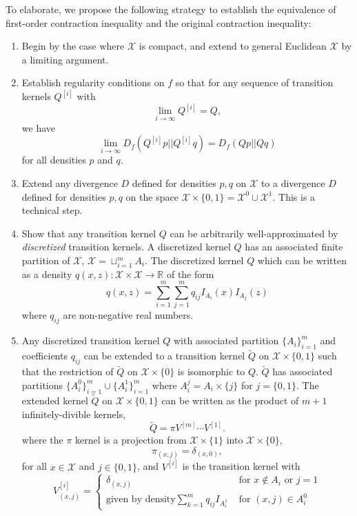 \documentclass[12pt]{article}
\begin{document}
To elaborate, we propose the following strategy to establish the
equivalence of first-order contraction inequality and the original
contraction inequality:
\begin{enumerate}
\item Begin by the case where $\mathcal{X}$ is compact, and extend to general Euclidean $\mathcal{X}$ by a limiting argument.
\item Establish regularity conditions on $f$ so that for any sequence of transition kernels $Q^{[i]}$ with
\[
\lim_{i \to \infty} Q^{[i]} = Q,
\]
we have
\[
\lim_{i \to \infty} D_f(Q^{[i]}p||Q^{[i]}q) = D_f(Qp||Qq)
\]
for all densities $p$ and $q$.
\item Extend any divergence $D$ defined for densities $p, q$ on $\mathcal{X}$ to a divergence $D$ defined for densities $p, q$ 
on the space $\mathcal{X} \times \{0,1\} = \mathcal{X}^0 \cup \mathcal{X}^1$.  This is a technical step.
\item Show that any transition kernel $Q$ can be arbitrarily well-approximated by \emph{discretized} transition kernels.
A discretized kernel $Q$ has an associated finite partition of $\mathcal{X}$, $\mathcal{X} = \sqcup_{i=1}^m A_i$. 
The discretized kernel $Q$ which can be written as a density $q(x,z): \mathcal{X} \times \mathcal{X} \to \mathbb{R}$ of the form
\[
q(x,z) = \sum_{i=1}^m \sum_{j=1}^m q_{ij} I_{A_i}(x) I_{A_j}(z)
\]
where $q_{ij}$ are non-negative real numbers.
\item Any discretized transition kernel $Q$ with associated partition $\{A_i\}_{i=1}^m$ and coefficients $q_{ij}$ can be extended to a transition kernel $\tilde{Q}$ on $\mathcal{X} \times \{0,1\}$ such that the restriction of $\tilde{Q}$ on $\mathcal{X} \times \{0\}$ is isomorphic to $Q$.
$\tilde{Q}$ has associated partitions $\{A_i^0\}_{i=1}^m \cup \{A_i^1\}_{i=1}^m$ where $A_i^j = A_i \times \{j\}$ for $j = \{0,1\}$.  The extended kernel $\tilde{Q}$ on $\mathcal{X} \times \{0,1\}$ can be written as the product of $m+1$ infinitely-divible kernels,
\[
\tilde{Q} = \pi V^{[m]} \cdots V^{[1]}.
\]
where the $\pi$ kernel is a projection from $\mathcal{X}\times\{1\}$ into $\mathcal{X}\times\{0\}$,
\[
\pi_{(x,j)} = \delta_{(x,0)},
\]
for all $x \in \mathcal{X}$ and $j \in \{0,1\}$,
and $V^{[i]}$ is the transition kernel with
\[
V^{[i]}_{(x,j)} = \begin{cases}
\delta_{(x,j)} & \text{ for } x \notin A_i \text{ or }j = 1\\
\text{given by density} \sum_{k = 1}^m q_{ij} I_{A_i^1} & \text{ for } (x, j) \in A_i^0
\end{cases}
\]
\end{enumerate}
\end{document}
